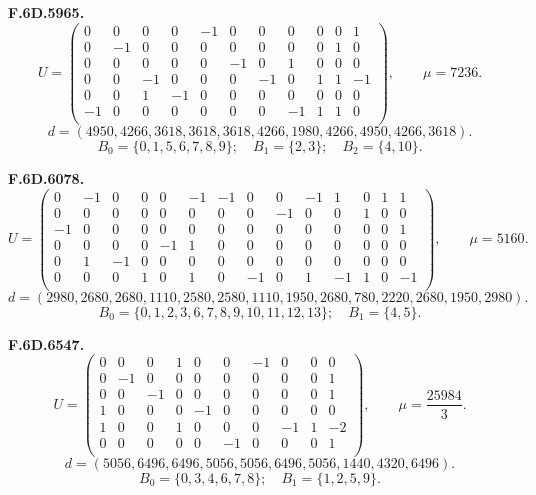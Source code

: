 \par\medskip\noindent\begin{minipage}{\linewidth}\textbf{F.6D.5965.}
\begingroup\small\setlength{\arraycolsep}{3pt}
\[U=\begin{pmatrix}
0 & 0 & 0 & 0 & -1 & 0 & 0 & 0 & 0 & 0 & 1\\
0 & -1 & 0 & 0 & 0 & 0 & 0 & 0 & 0 & 1 & 0\\
0 & 0 & 0 & 0 & 0 & -1 & 0 & 1 & 0 & 0 & 0\\
0 & 0 & -1 & 0 & 0 & 0 & -1 & 0 & 1 & 1 & -1\\
0 & 0 & 1 & -1 & 0 & 0 & 0 & 0 & 0 & 0 & 0\\
-1 & 0 & 0 & 0 & 0 & 0 & 0 & -1 & 1 & 1 & 0\\
\end{pmatrix},\qquad \mu=7236.\]
\[d=(4950,4266,3618,3618,3618,4266,1980,4266,4950,4266,3618).\]
\[B_0=\{0,1,5,6,7,8,9\};\quad B_1=\{2,3\};\quad B_2=\{4,10\}.\]
\endgroup\end{minipage}\par
\par\medskip\noindent\begin{minipage}{\linewidth}\textbf{F.6D.6078.}
\begingroup\small\setlength{\arraycolsep}{3pt}
\[U=\begin{pmatrix}
0 & -1 & 0 & 0 & 0 & -1 & -1 & 0 & 0 & -1 & 1 & 0 & 1 & 1\\
0 & 0 & 0 & 0 & 0 & 0 & 0 & 0 & -1 & 0 & 0 & 1 & 0 & 0\\
-1 & 0 & 0 & 0 & 0 & 0 & 0 & 0 & 0 & 0 & 0 & 0 & 0 & 1\\
0 & 0 & 0 & 0 & -1 & 1 & 0 & 0 & 0 & 0 & 0 & 0 & 0 & 0\\
0 & 1 & -1 & 0 & 0 & 0 & 0 & 0 & 0 & 0 & 0 & 0 & 0 & 0\\
0 & 0 & 0 & 1 & 0 & 1 & 0 & -1 & 0 & 1 & -1 & 1 & 0 & -1\\
\end{pmatrix},\qquad \mu=5160.\]
\[d=(2980,2680,2680,1110,2580,2580,1110,1950,2680,780,2220,2680,1950,2980).\]
\[B_0=\{0,1,2,3,6,7,8,9,10,11,12,13\};\quad B_1=\{4,5\}.\]
\endgroup\end{minipage}\par
\par\medskip\noindent\begin{minipage}{\linewidth}\textbf{F.6D.6547.}
\begingroup\small\setlength{\arraycolsep}{3pt}
\[U=\begin{pmatrix}
0 & 0 & 0 & 1 & 0 & 0 & -1 & 0 & 0 & 0\\
0 & -1 & 0 & 0 & 0 & 0 & 0 & 0 & 0 & 1\\
0 & 0 & -1 & 0 & 0 & 0 & 0 & 0 & 0 & 1\\
1 & 0 & 0 & 0 & -1 & 0 & 0 & 0 & 0 & 0\\
1 & 0 & 0 & 1 & 0 & 0 & 0 & -1 & 1 & -2\\
0 & 0 & 0 & 0 & 0 & -1 & 0 & 0 & 0 & 1\\
\end{pmatrix},\qquad \mu=\frac{25984}{3}.\]
\[d=(5056,6496,6496,5056,5056,6496,5056,1440,4320,6496).\]
\[B_0=\{0,3,4,6,7,8\};\quad B_1=\{1,2,5,9\}.\]
\endgroup\end{minipage}\par
